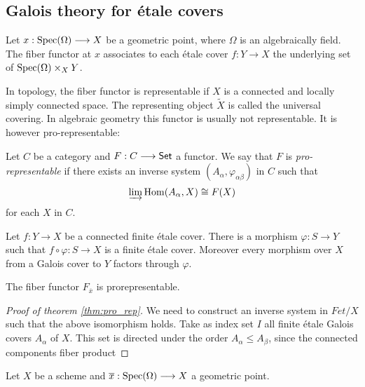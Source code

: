 \subsection{Galois theory for \'etale covers}
\begin{definition}
  Let $x: \operatorname{Spec}(\Omega) \longrightarrow X$ be a geometric point, where $\Omega$ is an algebraically field. The fiber functor at $x$ associates to each \'etale cover $f: Y \to X$ the underlying set of $\operatorname{Spec}(\Omega) \times_X Y$.
\end{definition}

\begin{remark}
  In topology, the fiber functor is representable if $X$ is a connected and locally simply connected space. The representing object $\tilde{X}$ is called the universal covering. In algebraic geometry this functor is usually not representable. It is however pro-representable:
\end{remark}

\begin{definition}
  Let $C$ be a category and $F: C \longrightarrow \mathsf{Set}$ a functor. We say that $F$ is \textit{pro-representable} if there exists an \Gls{inverse system} $(A_\alpha,\varphi_{\alpha \beta})$ in $C$ such that 
  \[
    \varinjlim \operatorname{Hom}(A_\alpha, X) \cong F(X)
    \]
  for each $X$ in $C$.
\end{definition}
\begin{lemma}
  Let $f: Y \to X$ be a connected finite \'etale cover. There is a morphism $\varphi: S \to Y$ such that $f \circ \varphi: S \to X$ is a finite \'etale cover. Moreover every morphism over $X$ from a Galois cover to $Y$ factors through $\varphi$.
\end{lemma}

\begin{theorem}\label{thm:pro_rep}
  The fiber functor $F_{\overline{x}}$ is prorepresentable.
\end{theorem}
\begin{proof}[Proof of theorem \ref{thm:pro_rep}]
  We need to construct an inverse system in $Fet/X$ such that the above isomorphism holds. Take as index set $I$ all finite \'etale Galois covers $A_\alpha$ of $X$. This set is directed under the order $A_\alpha \le A_\beta$, since the connected components fiber product
\end{proof}

\begin{theorem}
  Let $X$ be a scheme and $\overline{x} : \operatorname{Spec}(\Omega) \longrightarrow X$ a geometric point.
\end{theorem}

